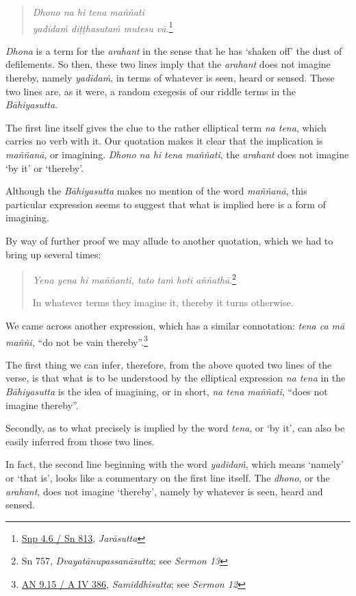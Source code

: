 \begin{quote}
\emph{Dhono na hi tena maññati}\\
\emph{yadidaṁ diṭṭhasutaṁ mutesu vā.}\footnote{\href{https://suttacentral.net/snp4.6/pli/ms}{Snp 4.6 / Sn 813}, \emph{Jarāsutta}}
\end{quote}

\emph{Dhona} is a term for the \emph{arahant} in the sense that he has `shaken off' the dust of defilements. So then, these two lines imply that the \emph{arahant} does not imagine thereby, namely \emph{yadidaṁ}, in terms of whatever is seen, heard or sensed. These two lines are, as it were, a random exegesis of our riddle terms in the \emph{Bāhiyasutta}.

The first line itself gives the clue to the rather elliptical term \emph{na tena}, which carries no verb with it. Our quotation makes it clear that the implication is \emph{maññanā}, or imagining. \emph{Dhono na hi tena maññati}, the \emph{arahant} does not imagine `by it' or `thereby'.

Although the \emph{Bāhiyasutta} makes no mention of the word \emph{maññanā}, this particular expression seems to suggest that what is implied here is a form of imagining.

By way of further proof we may allude to another quotation, which we had to bring up several times:

\begin{quote}
\emph{Yena yena hi maññanti, tato taṁ hoti aññathā}.\footnote{Sn 757, \emph{Dvayatānupassanāsutta}; see \emph{Sermon 13}}

In whatever terms they imagine it, thereby it turns otherwise.
\end{quote}

We came across another expression, which has a similar connotation: \emph{tena ca mā maññi,} ``do not be vain thereby''.\footnote{\href{https://suttacentral.net/an9.15/pli/ms}{AN 9.15 / A IV 386}, \emph{Samiddhisutta}; see \emph{Sermon 12}}

The first thing we can infer, therefore, from the above quoted two lines of the verse, is that what is to be understood by the elliptical expression \emph{na tena} in the \emph{Bāhiyasutta} is the idea of imagining, or in short, \emph{na tena maññati}, ``does not imagine thereby''.

Secondly, as to what precisely is implied by the word \emph{tena}, or `by it', can also be easily inferred from those two lines.

In fact, the second line beginning with the word \emph{yadidaṁ}, which means `namely' or `that is', looks like a commentary on the first line itself. The \emph{dhono}, or the \emph{arahant}, does not imagine `thereby', namely by whatever is seen, heard and sensed.

